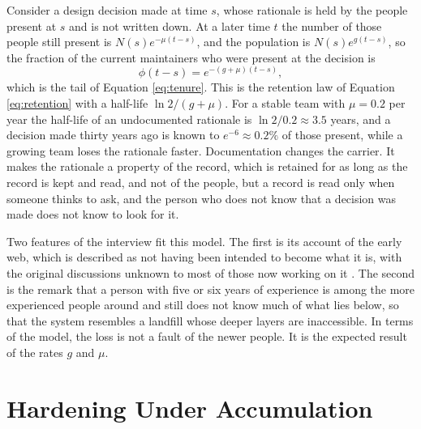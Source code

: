 \documentclass[11pt,openany]{book}
\theoremstyle{definition}
\theoremstyle{remark}
\begin{document}
Consider a design decision made at time $s$, whose rationale is held by the people present at $s$ and is not written down. At a later time $t$ the number of those people still present is $N(s)e^{-\mu(t-s)}$, and the population is $N(s)e^{g(t-s)}$, so the fraction of the current maintainers who were present at the decision is
\begin{equation}
\phi(t-s)=e^{-(g+\mu)(t-s)},
\end{equation}
which is the tail of Equation \eqref{eq:tenure}. This is the retention law of Equation \eqref{eq:retention} with a half-life $\ln2/(g+\mu)$. For a stable team with $\mu=0.2$ per year the half-life of an undocumented rationale is $\ln2/0.2\approx3.5$ years, and a decision made thirty years ago is known to $e^{-6}\approx0.2\%$ of those present, while a growing team loses the rationale faster. Documentation changes the carrier. It makes the rationale a property of the record, which is retained for as long as the record is kept and read, and not of the people, but a record is read only when someone thinks to ask, and the person who does not know that a decision was made does not know to look for it.

Two features of the interview fit this model. The first is its account of the early web, which is described as not having been intended to become what it is, with the original discussions unknown to most of those now working on it \cite{blow2026}. The second is the remark that a person with five or six years of experience is among the more experienced people around and still does not know much of what lies below, so that the system resembles a landfill whose deeper layers are inaccessible. In terms of the model, the loss is not a fault of the newer people. It is the expected result of the rates $g$ and $\mu$.

\section{Hardening Under Accumulation}
\end{document}
